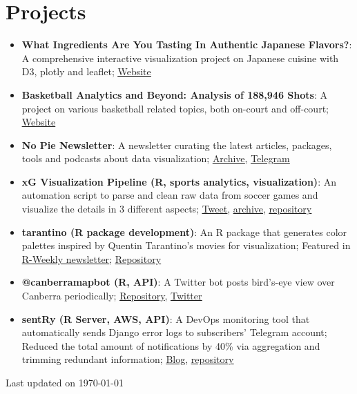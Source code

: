 \documentclass[letterpaper,10pt]{article}
\newcommand{\resumeItem}[2]{
  \item\small{
    \textbf{#1}{: #2 \vspace{-2pt}}
  }
}
\newcommand{\resumeSubItem}[2]{\resumeItem{#1}{#2}\vspace{-4pt}}
\newcommand{\resumeSubHeadingListStart}{\begin{itemize}[leftmargin=*]}
\newcommand{\resumeSubHeadingListEnd}{\end{itemize}}
\newcommand{\updateinfo}[1][\today]{\par\vfill\hfill{\scriptsize Last updated on #1}}
\begin{document}
\section{Projects}
  \resumeSubHeadingListStart
    \resumeSubItem{What Ingredients Are You Tasting In Authentic Japanese Flavors?}{A comprehensive interactive visualization project on Japanese cuisine with D3, plotly and leaflet;}\href{https://celeritasml.github.io/project-japanese-cuisine/}{\underline{Website}}
  	\resumeSubItem{Basketball Analytics and Beyond: Analysis of 188,946 Shots}{A project on various basketball related topics, both on-court and off-court; \href{https://rexarski.github.io/bba}{\underline{Website}}}
    \resumeSubItem{No Pie Newsletter}{A newsletter curating the latest articles, packages, tools and podcasts about data visualization; \href{https://github.com/rexarski/2nd-blog/tree/main/content/nopie}{\underline{Archive}}, \href{https://t.me/itsnopie}{\underline{Telegram}}}
    \resumeSubItem{xG Visualization Pipeline (R, sports analytics, visualization)}
      {An automation script to parse and clean raw data from soccer games and visualize the details in 3 different aspects; \href{https://twitter.com/rexarski/status/1377860255271428097?s=20&t=TgdEjpB-rq6nS0eOTtt32A}{\underline{Tweet}}, \href{https://github.com/rexarski/2nd-blog/blob/main/content/posts/2021-04-07-visualize-xg.md}{\underline{archive}}, \href{https://github.com/rexarski/box2box}{\underline{repository}}}
    \resumeSubItem{tarantino (R package development)}
      {An R package that generates color palettes inspired by Quentin Tarantino's movies for visualization; Featured in \href{https://rweekly.org/2021-W14.html}{\underline{R-Weekly newsletter}}; \href{https://github.com/rexarski/tarantino}{\underline{Repository}}}
    \resumeSubItem{@canberramapbot (R, API)}{A Twitter bot posts bird's-eye view over Canberra periodically; \href{https://github.com/rexarski/canberramapbot}{\underline{Repository}}, \href{https://twitter.com/canberramapbot}{\underline{Twitter}}}
    \resumeSubItem{sentRy (R Server, AWS, API)}
      {A DevOps monitoring tool that automatically sends Django error logs to subscribers' Telegram account; Reduced the total amount of notifications by 40\% via aggregation and trimming redundant information; \href{https://github.com/rexarski/2nd-blog/blob/main/content/posts/2020-02-14-sentry.md}{\underline{Blog}}, \href{https://github.com/rexarski/sentRy}{\underline{repository}}}
  \resumeSubHeadingListEnd

  \updateinfo[\today]

\end{document}
